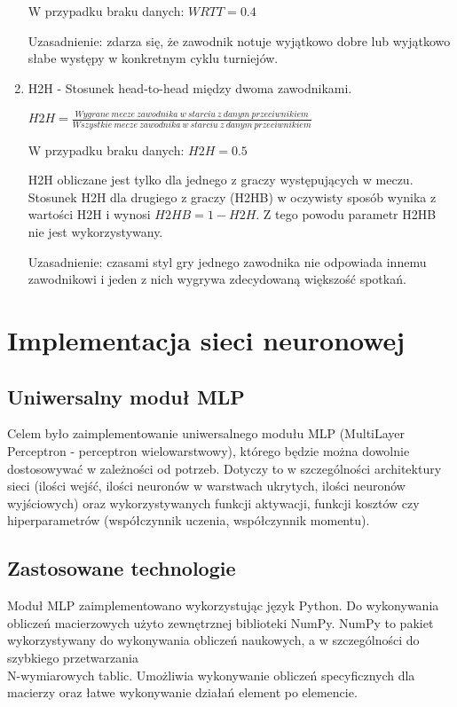 \begin{enumerate}
W przypadku braku danych: $WRTT = 0.4$

Uzasadnienie: zdarza się, że zawodnik notuje wyjątkowo dobre lub wyjątkowo słabe występy w konkretnym cyklu turniejów.

\item H2H - Stosunek head-to-head między dwoma zawodnikami.

$H2H = \frac{Wygrane\ mecze\ zawodnika\ w\ starciu\ z\ danym\ przeciwnikiem}{Wszystkie\ mecze\ zawodnika\ w\ starciu\ z\ danym\ przeciwnikiem}$

W przypadku braku danych: $H2H = 0.5$

H2H obliczane jest tylko dla jednego z graczy występujących w meczu. Stosunek H2H dla drugiego z graczy (H2HB) w oczywisty sposób wynika z wartości H2H i wynosi $H2HB = 1 - H2H$. Z tego powodu parametr H2HB nie jest wykorzystywany.

Uzasadnienie: czasami styl gry jednego zawodnika nie odpowiada innemu zawodnikowi i jeden z nich wygrywa zdecydowaną większość spotkań.

\end{enumerate}

\chapter{Implementacja sieci neuronowej}
\section{Uniwersalny moduł MLP}
\label{Sec:MLPMod}

Celem było zaimplementowanie uniwersalnego modułu MLP (MultiLayer Perceptron - perceptron wielowarstwowy), którego będzie można dowolnie dostosowywać w zależności od potrzeb. Dotyczy to w szczególności architektury sieci (ilości wejść, ilości neuronów w warstwach ukrytych, ilości neuronów wyjściowych) oraz wykorzystywanych funkcji aktywacji, funkcji kosztów czy hiperparametrów (współczynnik uczenia, współczynnik momentu).

\section{Zastosowane technologie}
\label{Sec:MLPTech}
Moduł MLP zaimplementowano wykorzystując język Python. Do wykonywania obliczeń macierzowych użyto zewnętrznej biblioteki NumPy. NumPy to pakiet wykorzystywany do wykonywania obliczeń naukowych, a w szczególności do szybkiego przetwarzania \\ N-wymiarowych tablic. Umożliwia wykonywanie obliczeń specyficznych dla macierzy oraz łatwe wykonywanie działań element po elemencie.


